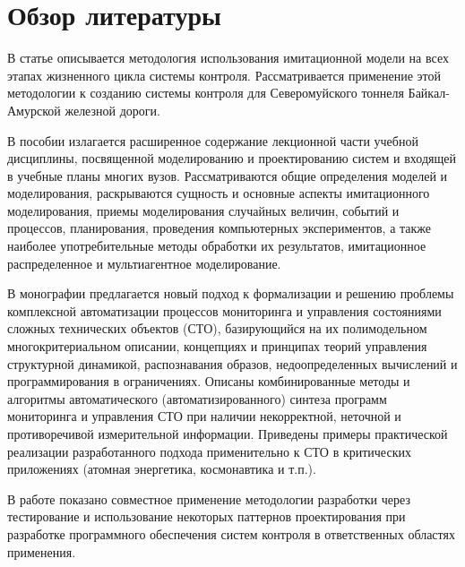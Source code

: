 \chapter*{Обзор литературы}


В статье \cite{journal:vechisl_tech:2004_okolnischnikov} описывается методология использования
имитационной модели на всех этапах жизненного цикла системы контроля.
Рассматривается применение этой методологии к созданию системы контроля для
Северомуйского тоннеля Байкал-Амурской железной дороги.


В пособии \cite{book:Immitmodelsiste} излагается расширенное содержание лекционной части учебной
дисциплины, посвященной моделированию и проектированию систем и входящей в учебные планы многих вузов. Рассматриваются общие определения
моделей и моделирования, раскрываются сущность и основные аспекты имитационного моделирования, приемы моделирования случайных величин, событий
и процессов, планирования, проведения компьютерных экспериментов, а также
наиболее употребительные методы обработки их результатов, имитационное
распределенное и мультиагентное моделирование. 


В монографии \cite{book:OhtilevSokolovUsupov} предлагается новый подход к формализации и решению проблемы комплексной автоматизации процессов мониторинга и управления состояниями сложных технических объектов (СТО), базирующийся на их полимодельном многокритериальном описании, концепциях и принципах теорий управления структурной динамикой, распознавания образов, недоопределенных вычислений и программирования в ограничениях. Описаны комбинированные методы и алгоритмы автоматического (автоматизированного) синтеза программ мониторинга и управления СТО при наличии некорректной, неточной и противоречивой измерительной информации. Приведены примеры практической реализации разработанного подхода применительно к СТО в критических приложениях (атомная энергетика, космонавтика и т.п.).


В работе \cite{bib:my:ttd_with_patterns_2019} показано совместное применение 
методологии разработки через тестирование и использование некоторых паттернов проектирования
при разработке программного обеспечения систем контроля в ответственных областях применения. 